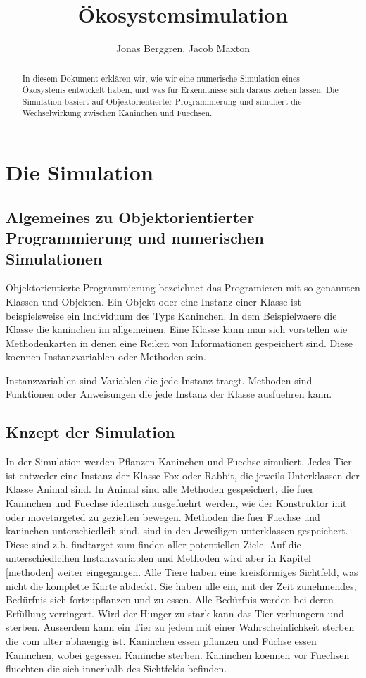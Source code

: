 \documentclass[12pt]{article}
\author{{\Large Jonas Berggren, Jacob Maxton}}
\title{{\myfont Ökosystemsimulation}}
\begin{document}
\maketitle
\begin{abstract}
In diesem Dokument erklären wir, wie wir eine numerische Simulation eines
	Ökosystems entwickelt haben, und was für Erkenntnisse sich daraus ziehen lassen.
Die Simulation basiert auf Objektorientierter Programmierung und simuliert die Wechselwirkung zwischen Kaninchen und Fuechsen.
\end{abstract}
\tableofcontents
\newpage
\section{Die Simulation}
\subsection{Algemeines zu Objektorientierter Programmierung und numerischen Simulationen}
Objektorientierte Programmierung bezeichnet das Programieren mit so genannten Klassen und Objekten.
Ein Objekt oder eine Instanz einer Klasse ist beispielsweise ein Individuum des Typs Kaninchen.
In dem Beispielwaere die Klasse die kaninchen im allgemeinen.
Eine Klasse kann man sich vorstellen wie Methodenkarten in denen eine Reiken von Informationen gespeichert sind.
Diese koennen Instanzvariablen oder Methoden sein.

Instanzvariablen sind Variablen die jede Instanz traegt.
Methoden sind Funktionen oder Anweisungen die jede Instanz der Klasse ausfuehren kann.
\subsection{Knzept der Simulation}
In der Simulation werden Pflanzen Kaninchen und Fuechse simuliert.
Jedes Tier ist entweder eine Instanz der Klasse Fox oder Rabbit, die jeweils Unterklassen der Klasse Animal sind.
In Animal sind alle Methoden gespeichert, die fuer Kaninchen und Fuechse identisch ausgefuehrt werden, wie der Konstruktor init oder movetargeted zu gezielten bewegen.
Methoden die fuer Fuechse und kaninchen unterschiedlcih sind, sind in den Jeweiligen unterklassen gespeichert.
Diese sind z.b. findtarget zum finden aller potentiellen Ziele.
Auf die unterschiedlcihen Instanzvariablen und Methoden wird aber in Kapitel \ref{methoden} weiter eingegangen.
Alle Tiere haben eine kreisförmiges Sichtfeld, was nicht die komplette Karte abdeckt.
Sie haben alle ein, mit der Zeit zunehmendes, Bedürfnis sich fortzupflanzen und zu essen.
Alle Bedürfnis werden bei deren Erfüllung verringert.
Wird der Hunger zu stark kann das Tier verhungern und sterben.
Ausserdem kann ein Tier zu jedem mit einer Wahrscheinlichkeit sterben die vom alter abhaengig ist.
Kaninchen essen pflanzen und Füchse essen Kaninchen, wobei gegessen Kaninche sterben.
Kaninchen koennen vor Fuechsen fluechten die sich innerhalb des Sichtfelds befinden.
\end{document}

